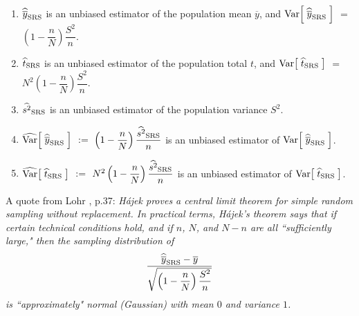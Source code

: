\documentclass{article}
\begin{document}
\begin{proposition}\label{SRS:unbiased:estimators}\quad
\begin{enumerate}
\item  $\widehat{\overline{y}}_{\textnormal{SRS}}$ is an unbiased estimator of the population mean $\overline{y}$, and
          $\textnormal{Var}\!\left[\;\widehat{\overline{y}}_{\textnormal{SRS}}\;\right]$ $=$ $\left(1-\dfrac{n}{N}\right)\dfrac{S^{2}}{n}$.
\item  $\widehat{t}_{\textnormal{SRS}}$ is an unbiased estimator of the population total $t$, and
          $\textnormal{Var}\!\left[\;\widehat{t}_{\textnormal{SRS}}\;\right]$ $=$ $N^{2}\left(1-\dfrac{n}{N}\right)\dfrac{S^{2}}{n}$.
\item  $\widehat{s^{2}}_{\textnormal{SRS}}$ is an unbiased estimator of the population variance $S^{2}$.
\item  $\widehat{\textnormal{Var}}\!\left[\;\widehat{\overline{y}}_{\textnormal{SRS}}\;\right]$
          $:=$ $\left(1-\dfrac{n}{N}\right)\dfrac{\widehat{s^{2}}_{\textnormal{SRS}}}{n}$
          is an unbiased estimator of $\textnormal{Var}\!\left[\;\widehat{\overline{y}}_{\textnormal{SRS}}\;\right]$.
\item  $\widehat{\textnormal{Var}}\!\left[\;\widehat{t}_{\textnormal{SRS}}\;\right]$
          $:=$ $N^{2}\left(1-\dfrac{n}{N}\right)\dfrac{\widehat{s^{2}}_{\textnormal{SRS}}}{n}$
          is an unbiased estimator of $\textnormal{Var}\!\left[\;\widehat{t}_{\textnormal{SRS}}\;\right]$.
\end{enumerate}
\end{proposition}

\noindent
A quote from Lohr \cite{Lohr1999}, p.37:
\emph{
H\'{a}jek \cite{Hajek1960} proves a central limit theorem for simple random sampling without replacement.  In practical terms, H\'{a}jek's theorem says that if certain technical conditions hold, and if $n$, $N$, and $N-n$ are all ``sufficiently large," then the sampling distribution of
\begin{equation*}
    \dfrac{\widehat{\overline{y}}_{\textnormal{SRS}}-\overline{y}}{\sqrt{\left(1-\dfrac{n}{N}\right)\dfrac{S^{2}}{n}}}
\end{equation*}
is ``approximately" normal (Gaussian) with mean $0$ and variance $1$.
}
\end{document}
